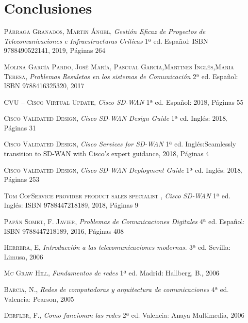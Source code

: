 \chapter{Conclusiones}
\label{cha:Conclusiones}


\begin{thebibliography}{a}

 \textsc{Párraga Granados, Martin Ángel},
\textit{Gestión Eficaz de Proyectos de Telecomunicaciones e Infraestructuras Críticas}
1ª ed. Español: ISBN 9788490522141, 2019, Páginas 264

 \textsc{Molina García Pardo, José María, Pascual García,Martines Inglés,Maria Teresa},
\textit{Problemas Resuletos en los sistemas de Comunicación}
2ª ed. Español: ISBN 9788416325320, 2017 

 \textsc{CVU – Cisco Virtual Update},
\textit{Cisco SD-WAN}
1ª ed. Español: 2018, Páginas 55

 \textsc{Cisco Validated Design},
\textit{Cisco SD-WAN Design Guide}
1ª ed. Inglés:  2018, Páginas 31

 \textsc{Cisco Validated Design},
\textit{Cisco Services for SD-WAN}
1ª ed. Inglés:Seamlessly transition to SD-WAN with Cisco's expert guidance,  2018, Páginas 4

 \textsc{Cisco Validated Design},
\textit{Cisco SD-WAN Deployment Guide}
1ª ed. Inglés: 2018, Páginas 253

 \textsc{Tom CofService provider product sales specialist },
\textit{Cisco SD-WAN}
1ª ed. Inglés: ISBN 9788447218189, 2018, Páginas 9


 \textsc{Papán Somet, F. Javier},
\textit{Problemas de Comunicaciones Digitales}
4ª ed. Español: ISBN 9788447218189, 2016, Páginas 408

 \textsc{Herrera, E},
\textit{Introducción a las telecomunicaciones modernas.}
3ª ed. Sevilla: Limusa, 2006  

 \textsc{Mc Graw Hill},
\textit{Fundamentos de redes}
1ª ed. Madrid: Hallberg, B., 2006

 \textsc{Barcia, N.},
\textit{Redes de computadoras y arquitectura de comunicaciones}
4ª ed. Valencia: Pearson, 2005 

 \textsc{Derfler, F.},
\textit{Como funcionan las redes}
2ª ed. Valencia: Anaya Multimedia, 2006 



\end{thebibliography}




 


